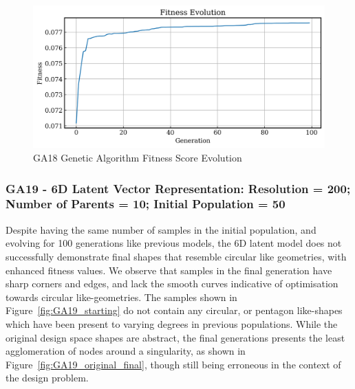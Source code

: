 \documentclass{article}
\begin{document}
\begin{figure}[H]
    \centering
    \includegraphics[width=0.75\linewidth]{figures/GAResults/GA18/10gen_fitness.png}
    \caption{GA18 Genetic Algorithm Fitness Score Evolution}
    \label{fig:GA18_fitness}
\end{figure}

\subsubsection*{GA19 - 6D Latent Vector Representation: Resolution = 200; Number of Parents = 10; Initial Population = 50}

Despite having the same number of samples in the initial population, and evolving for 100 generations like previous models, the 6D latent model does not successfully demonstrate final shapes that resemble circular like geometries, with enhanced fitness values. We observe that samples in the final generation have sharp corners and edges, and lack the smooth curves indicative of optimisation towards circular like-geometries. The samples shown in Figure~\ref{fig:GA19_starting} do not contain any circular, or pentagon like-shapes which have been present to varying degrees in previous populations. While the original design space shapes are abstract, the final generations presents the least agglomeration of nodes around a singularity, as shown in Figure~\ref{fig:GA19_original_final}, though still being erroneous in the context of the design problem.
\end{document}
